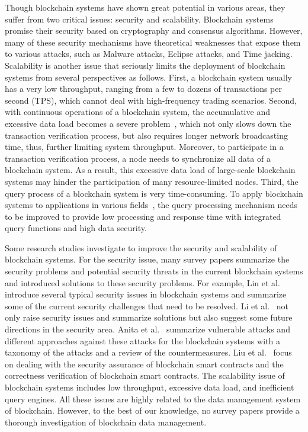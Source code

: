 \documentclass[acmsmall]{acmart}
\begin{document}
Though blockchain systems have shown great potential in various areas, they suffer from two critical issues: security and scalability. Blockchain systems promise their security based on cryptography and consensus algorithms. However, many of these security mechanisms have theoretical weaknesses that expose them to various attacks, such as Malware attacks, Eclipse attacks, and Time jacking. Scalability is another issue that seriously limits the deployment of blockchain systems from several perspectives as follows. First, a blockchain system usually has a very low throughput, ranging from a few to dozens of transactions per second (TPS), which cannot deal with high-frequency trading scenarios. 
Second, with continuous operations of a blockchain system, the accumulative and excessive data load becomes a severe problem~\cite{timmurphy.org}, which not only slows down the transaction verification process, but also requires longer network broadcasting time, thus, further limiting system throughput. Moreover, to participate in a transaction verification process, a node needs to synchronize all data of a blockchain system. As a result, this excessive data load of large-scale blockchain systems may hinder the participation of many resource-limited nodes. 
Third, the query process of a blockchain system is very time-consuming. 
To apply blockchain systems to applications in various fields~\cite{bonneau2015sok}, the query processing mechanism needs to be improved to provide low processing and response time with integrated query functions and high data security.

Some research studies investigate to improve the security and scalability of blockchain systems. For the security issue, many survey papers summarize the security problems and potential security threats in the current blockchain systems and introduced solutions to these security problems. For example, Lin et al.~\cite{lin2017survey} introduce several typical security issues in blockchain systems and summarize some of the current security challenges that need to be resolved. Li et al.~\cite{li2020survey} not only raise security issues and summarize solutions but also suggest some future directions in the security area. Anita et al.~\cite{8944615} summarize vulnerable attacks and different approaches against these attacks for the blockchain systems with a taxonomy of the attacks and a review of the countermeasures. Liu et al.~\cite{liu2019survey} focus on dealing with the security assurance of blockchain smart contracts and the correctness verification of blockchain smart contracts. 
The scalability issue of blockchain systems includes low throughput, excessive data load, and inefficient query engines. All these issues are highly related to the data management system of blockchain. However, to the best of our knowledge, no survey papers provide a thorough investigation of blockchain data management.
\end{document}
